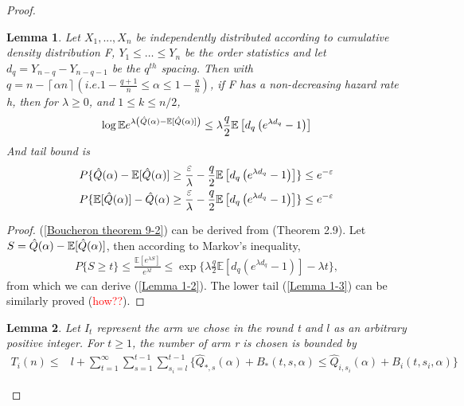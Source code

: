 \documentclass{article}
\theoremstyle{plain}
\newtheorem{lemma}{Lemma}
\begin{document}
\begin{proof}

\begin{lemma}
Let $X_1,..., X_n$ be independently distributed according to cumulative density distribution F, $Y_{1} \leq \ldots \leq Y_{n}$ be the order statistics and let $d_q = Y_{n-q} - Y_{n-q-1}$ be the $q^{th}$ spacing. Then with $q = n - \left\lceil \alpha n \right\rceil (i.e. 1 - \frac{q+1}{n} \leq \alpha \leq 1 - \frac{q}{n})$, if F has a non-decreasing hazard rate h, then for $\lambda \geq 0$, and $1\leq k \leq n/2$,
\begin{align}
    \label{Boucheron theorem 9-2}
    \log \mathbb{E}e^{\lambda\left(\Hat{Q}(\alpha)-\mathbb{E}[ \Hat{Q}(\alpha)]\right)} \leq \lambda \frac{q}{2} \mathbb{E}\left[d_q\left(e^{\lambda d_q}-1\right)\right]
\end{align}
And tail bound is
\begin{align}
    \label{Lemma 1-2}
   P\{\Hat{Q}(\alpha)-\mathbb{E}[ \Hat{Q}(\alpha)] \geq \frac{\varepsilon}{\lambda} - \frac{q}{2} \mathbb{E}\left[d_q\left(e^{\lambda d_q}-1\right)\right]\} \leq e^{-\varepsilon}\\
   \label{Lemma 1-3}
   P\{\mathbb{E}[ \Hat{Q}(\alpha)] - \Hat{Q}(\alpha) \geq \frac{\varepsilon}{\lambda} - \frac{q}{2} \mathbb{E}\left[d_q\left(e^{\lambda d_q}-1\right)\right]\} \leq e^{-\varepsilon}
\end{align}
\end{lemma}

\begin{proof}
(\ref{Boucheron theorem 9-2}) can be derived from \cite{boucheron2012}(Theorem 2.9).  Let $S = \Hat{Q}(\alpha)-\mathbb{E}[ \Hat{Q}(\alpha)]$, then according to Markov's inequality,
\begin{align}
    P \{S \geq t\} \leq \frac{\mathbb{E}[e^{\lambda S}]}{e^{\lambda t}} \leq \exp\{\lambda \frac{q}{2} \mathbb{E}\left[d_q\left(e^{\lambda d_q}-1\right)\right] - \lambda t\},
\end{align}
from which we can derive (\ref{Lemma 1-2}). The lower tail (\ref{Lemma 1-3}) can be similarly proved (\textcolor{red}{how??}).
\end{proof}

\begin{lemma}
Let $I_t$ represent the arm we chose in the round t and $l$ as an arbitrary positive integer. For $t \geq 1$, the number of arm r is chosen is bounded by
\begin{align}
    T_i(n) \leq & l + \sum_{t = 1}^\infty \sum_{s = 1}^{t-1} \sum_{s_i = l}^{t-1} \{\hat{Q}_{*, s}(\alpha) + B_*(t, s, \alpha)  \leq \hat{Q}_{i, s_i}(\alpha) + B_i(t, s_i, \alpha)\}
\end{align}
\end{lemma}


\end{proof}
\end{document}

